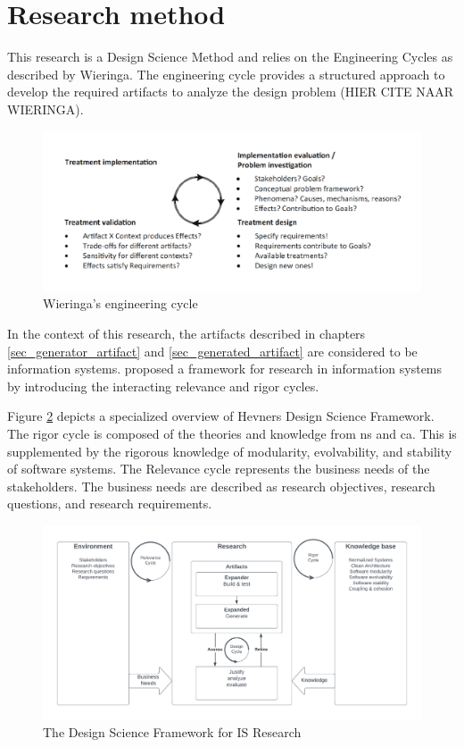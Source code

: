 \section{Research method} \label{sec_research_method}

This research is a Design Science Method and relies on the Engineering Cycles as described
by Wieringa. The engineering cycle provides a structured approach to develop the
required artifacts to analyze the design problem (HIER CITE NAAR WIERINGA).

\begin{figure}[H]
    \centering
    \includegraphics[width=1\textwidth]{Figures/engineering_cycle.pdf}
    \caption[Engineering cycle]{Wieringa's engineering cycle}
    \label{fig_engineering_cycle}
\end{figure}

In the context of this research, the artifacts described in chapters
\ref{sec_generator_artifact} and \ref{sec_generated_artifact} are considered to be
information systems. \citeauthor{hevner_design_nodate} proposed a framework for research
in information systems by introducing the interacting relevance and rigor cycles.

Figure \ref{fig_dsr} depicts a specialized overview of Hevners Design Science Framework.
The rigor cycle is composed of the theories and knowledge from \gls{ns}
and \gls{ca}. This is supplemented by the rigorous knowledge of modularity,
evolvability, and stability of software systems. The Relevance cycle represents the
business needs of the stakeholders. The business needs are described as research
objectives, research questions, and research requirements.

\begin{figure}[H]
    \centering
    \includegraphics[width=1\textwidth]{Figures/rigor_relevance_cycle.pdf}
    \caption[DSF]{The Design Science Framework for IS Research}
    \label{fig_dsr}
\end{figure}